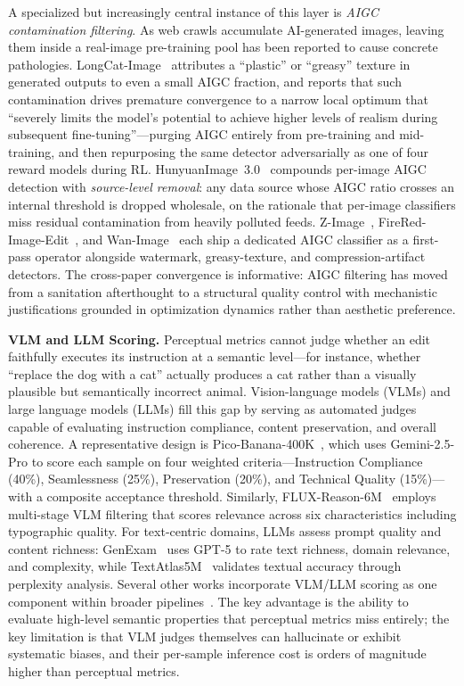 \documentclass{llmxive}
\begin{document}
A specialized but increasingly central instance of this layer is \emph{AIGC contamination filtering}. As web crawls accumulate AI-generated images, leaving them inside a real-image pre-training pool has been reported to cause concrete pathologies. LongCat-Image~\citep{team2025longcat} attributes a ``plastic'' or ``greasy'' texture in generated outputs to even a small AIGC fraction, and reports that such contamination drives premature convergence to a narrow local optimum that ``severely limits the model's potential to achieve higher levels of realism during subsequent fine-tuning''---purging AIGC entirely from pre-training and mid-training, and then repurposing the same detector adversarially as one of four reward models during RL. HunyuanImage~3.0~\citep{cao2025hunyuanimage} compounds per-image AIGC detection with \emph{source-level removal}: any data source whose AIGC ratio crosses an internal threshold is dropped wholesale, on the rationale that per-image classifiers miss residual contamination from heavily polluted feeds. Z-Image~\citep{cai2025z}, FireRed-Image-Edit~\citep{team2026firered}, and Wan-Image~\citep{mao2026wan} each ship a dedicated AIGC classifier as a first-pass operator alongside watermark, greasy-texture, and compression-artifact detectors. The cross-paper convergence is informative: AIGC filtering has moved from a sanitation afterthought to a structural quality control with mechanistic justifications grounded in optimization dynamics rather than aesthetic preference.

\textbf{VLM and LLM Scoring.}
Perceptual metrics cannot judge whether an edit faithfully executes its instruction at a semantic level---for instance, whether ``replace the dog with a cat'' actually produces a cat rather than a visually plausible but semantically incorrect animal. Vision-language models (VLMs) and large language models (LLMs) fill this gap by serving as automated judges capable of evaluating instruction compliance, content preservation, and overall coherence. A representative design is Pico-Banana-400K~\citep{qian2025pico}, which uses Gemini-2.5-Pro to score each sample on four weighted criteria---Instruction Compliance (40\%), Seamlessness (25\%), Preservation (20\%), and Technical Quality (15\%)---with a composite acceptance threshold. Similarly, FLUX-Reason-6M~\citep{fang2025flux} employs multi-stage VLM filtering that scores relevance across six characteristics including typographic quality. For text-centric domains, LLMs assess prompt quality and content richness: GenExam~\citep{wang2025genexam} uses GPT-5 to rate text richness, domain relevance, and complexity, while TextAtlas5M~\citep{wang2025textatlas5m} validates textual accuracy through perplexity analysis. Several other works incorporate VLM/LLM scoring as one component within broader pipelines~\citep{liu2025step1x, wei2024omniedit, ye2025imgedit, taesiri2025understanding}. The key advantage is the ability to evaluate high-level semantic properties that perceptual metrics miss entirely; the key limitation is that VLM judges themselves can hallucinate or exhibit systematic biases, and their per-sample inference cost is orders of magnitude higher than perceptual metrics.
\end{document}
